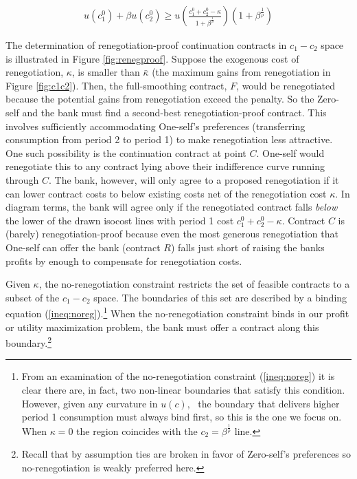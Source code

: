 \documentclass[11pt,english]{article}
\theoremstyle{plain}
\theoremstyle{definition}
\begin{document}
\begin{align}
u(c_{1}^{0})+\beta u(c_{2}^{0})\ge u\left(\frac{c_{1}^{0}+c_{2}^{0}-\kappa}{1+\beta^{\frac{1}{\rho}}}\right)(1+\beta^{\frac{1}{\rho}})\label{ineq:noreg}
\end{align}

The determination of renegotiation-proof continuation contracts in $c_{1}-c_{2}$ space is illustrated in Figure \ref{fig:renegproof}. Suppose the exogenous cost of renegotiation, $\kappa$, is smaller than $\bar{\kappa}$ (the maximum gains from renegotiation in Figure \ref{fig:c1c2}). Then, the full-smoothing contract, $F$, would be renegotiated because the potential gains from renegotiation exceed the penalty.
So the Zero-self and the bank must find a second-best renegotiation-proof contract. This involves sufficiently accommodating One-self's preferences (transferring consumption from period 2 to period 1) to make renegotiation less attractive. One such possibility is the continuation contract at point $C$. One-self would renegotiate this to any contract lying above their indifference
curve running through $C$. The bank, however, will only agree to a proposed renegotiation if it can lower contract costs to below existing costs net of the renegotiation cost $\kappa.$ In diagram terms, the
bank will agree only if the renegotiated contract falls \textit{below} the lower of the drawn isocost lines with period 1 cost $c_{1}^{0}+c_{2}^{0}-\kappa$.
Contract $C$ is (barely) renegotiation-proof because even the most generous renegotiation that One-self can offer the bank (contract $R$) falls just short of raising the banks profits by enough to compensate for renegotiation costs.

Given $\kappa$, the no-renegotiation constraint restricts the set of feasible contracts to a subset of the $c_{1}-c_{2}$ space. The boundaries of this set are described by a binding equation (\ref{ineq:noreg}).\footnote{From  an examination of the no-renegotiation constraint
(\ref{ineq:noreg}) it is clear there are, in fact, two non-linear boundaries that satisfy this condition. However, given any curvature in \(u(c), \text{ } \)the boundary that delivers higher period 1 consumption must always bind first, so this is the one we focus on.
When $\kappa=0$ the region coincides with the $c_{2}=\beta^{\frac{1}{\rho}}$
line.} When the no-renegotiation
constraint binds in our profit or utility maximization problem, the
bank must offer a contract along this boundary.\footnote{Recall that by assumption ties are broken in favor of Zero-self's
preferences so no-renegotiation is weakly preferred here. } 
\end{document}
